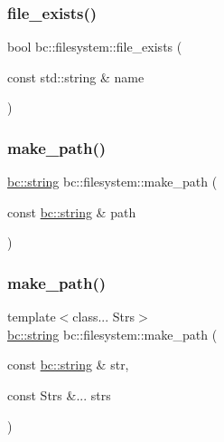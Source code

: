 \mbox{\label{namespacebc_1_1filesystem_ab6e57f166ef958e7ffce32be6d58caa1}} 
\subsubsection{\texorpdfstring{file\+\_\+exists()}{file\_exists()}}
{\footnotesize\ttfamily bool bc\+::filesystem\+::file\+\_\+exists (\begin{DoxyParamCaption}\item[{const std\+::string \&}]{name }\end{DoxyParamCaption})\hspace{0.3cm}{\ttfamily [inline]}}

\mbox{\label{namespacebc_1_1filesystem_aff59293c3d3adb990d7527a863af0b28}} 
\subsubsection{\texorpdfstring{make\+\_\+path()}{make\_path()}\hspace{0.1cm}{\footnotesize\ttfamily [1/2]}}
{\footnotesize\ttfamily \hyperlink{structbc_1_1string}{bc\+::string} bc\+::filesystem\+::make\+\_\+path (\begin{DoxyParamCaption}\item[{const \hyperlink{structbc_1_1string}{bc\+::string} \&}]{path }\end{DoxyParamCaption})\hspace{0.3cm}{\ttfamily [inline]}}

\mbox{\label{namespacebc_1_1filesystem_aca4cd8fad6039b34560ca608a548fc35}} 
\subsubsection{\texorpdfstring{make\+\_\+path()}{make\_path()}\hspace{0.1cm}{\footnotesize\ttfamily [2/2]}}
{\footnotesize\ttfamily template$<$class... Strs$>$ \\
\hyperlink{structbc_1_1string}{bc\+::string} bc\+::filesystem\+::make\+\_\+path (\begin{DoxyParamCaption}\item[{const \hyperlink{structbc_1_1string}{bc\+::string} \&}]{str,  }\item[{const Strs \&...}]{strs }\end{DoxyParamCaption})\hspace{0.3cm}{\ttfamily [inline]}}

